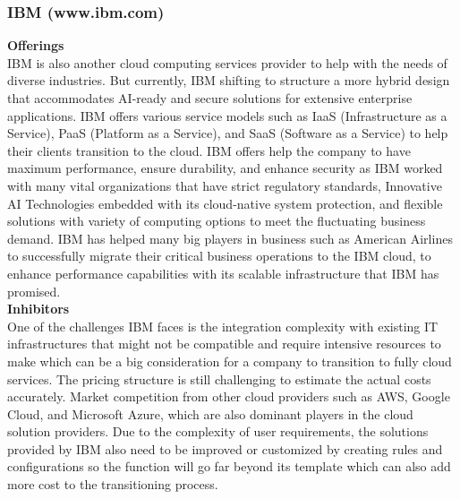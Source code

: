 \documentclass[12pt,a4paper]{article}
\begin{document}
\subsubsection{IBM (www.ibm.com)} 
\noindent\textbf{Offerings}\\
\noindent IBM is also another cloud computing services provider to help with the needs of diverse industries. But currently, IBM shifting to structure a more hybrid design that accommodates AI-ready and secure solutions for extensive enterprise applications. IBM offers various service models such as IaaS (Infrastructure as a Service), PaaS (Platform as a Service), and SaaS (Software as a Service) to help their clients transition to the cloud. IBM offers help the company to have maximum performance, ensure durability, and enhance security as IBM worked with many vital organizations that have strict regulatory standards, Innovative AI Technologies embedded with its cloud-native system protection, and flexible solutions with variety of computing options to meet the fluctuating business demand. IBM has helped many big players in business such as American Airlines to successfully migrate their critical business operations to the IBM cloud, to enhance performance capabilities with its scalable infrastructure that IBM has promised.\\

\noindent\textbf{Inhibitors}\\
\noindent One of the challenges IBM faces is the integration complexity with existing IT infrastructures that might not be compatible and require intensive resources to make which can be a big consideration for a company to transition to fully cloud services. The pricing structure is still challenging to estimate the actual costs accurately. Market competition from other cloud providers such as AWS, Google Cloud, and Microsoft Azure, which are also dominant players in the cloud solution providers. Due to the complexity of user requirements, the solutions provided by IBM also need to be improved or customized by creating rules and configurations so the function will go far beyond its template \citep{question_3.4} which can also add more cost to the transitioning process.\\  
\end{document}
